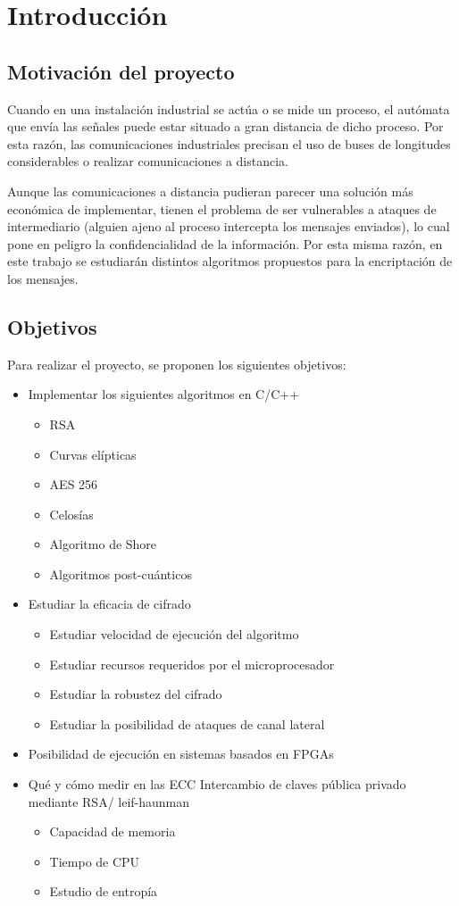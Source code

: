 \chapter{Introducción}

\section{Motivación del proyecto}
Cuando en una instalación industrial se actúa o se mide un proceso, el autómata que envía las señales puede estar situado a gran distancia de dicho proceso. Por esta razón, las comunicaciones industriales precisan el uso de buses de longitudes considerables o realizar comunicaciones a distancia. 
\newline

Aunque las comunicaciones a distancia pudieran parecer una solución más económica de implementar, tienen el problema de ser vulnerables a ataques de intermediario (alguien ajeno al proceso intercepta los mensajes enviados), lo cual pone en peligro la confidencialidad de la información. Por esta misma razón, en este trabajo se estudiarán distintos algoritmos propuestos para la encriptación de los mensajes.
\section{Objetivos}
Para realizar el proyecto, se proponen los siguientes objetivos:
\begin{itemize}
\item Implementar los siguientes algoritmos en C/C++
\begin{itemize}
	\item RSA
	\item Curvas elípticas
	\item AES 256
	\item Celosías
	\item Algoritmo de Shore
	\item Algoritmos post-cuánticos
\end{itemize}
\item Estudiar la eficacia de cifrado
\begin{itemize}
	\item Estudiar velocidad de ejecución del algoritmo
	\item Estudiar recursos requeridos por el microprocesador
	\item Estudiar la robustez del cifrado
	\item Estudiar la posibilidad de ataques de canal lateral
\end{itemize}
\item Posibilidad de ejecución en sistemas basados en FPGAs

\item Qué y cómo medir en las ECC
Intercambio de claves pública privado mediante RSA/ leif-haunman
\begin{itemize}
	\item Capacidad de memoria 
	\item Tiempo de CPU  
	\item Estudio de entropía 
\end{itemize}
\end{itemize}


